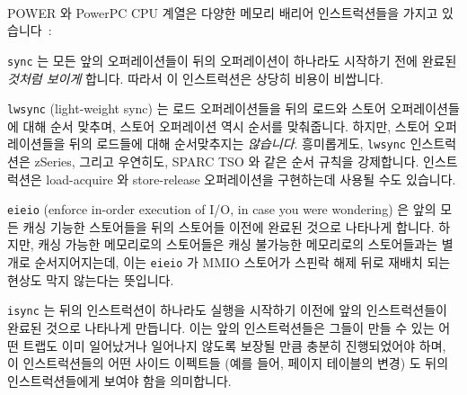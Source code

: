 POWER 와 PowerPC\textsuperscript{\textregistered} CPU 계열은 다양한 메모리
배리어 인스트럭션들을 가지고 있습니다~\cite{PowerPC94,MichaelLyons05a}:
\begin{description}
\item	{\tt sync} 는 모든 앞의 오퍼레이션들이 뒤의 오퍼레이션이 하나라도
	시작하기 전에 완료된 {\em 것처럼 보이게} 합니다.
	따라서 이 인스트럭션은 상당히 비용이 비쌉니다.
\item	{\tt lwsync} (light-weight sync) 는 로드 오퍼레이션들을 뒤의 로드와
	스토어 오퍼레이션들에 대해 순서 맞추며, 스토어 오퍼레이션 역시 순서를
	맞춰줍니다.
	하지만, 스토어 오퍼레이션들을 뒤의 로드들에 대해 순서맞추지는 {\em
	않습니다}.
	흥미롭게도, {\tt lwsync} 인스트럭션은 zSeries, 그리고 우연히도, SPARC
	TSO 와 같은 순서 규칙을 강제합니다.
	 인스트럭션은 load-acquire 와 store-release 오퍼레이션을
	구현하는데 사용될 수도 있습니다.
\item	{\tt eieio} (enforce in-order execution of I/O, in case you were
	wondering) 은 앞의 모든 캐싱 기능한 스토어들을 뒤의 스토어들 이전에
	완료된 것으로 나타나게 합니다.
	하지만, 캐싱 가능한 메모리로의 스토어들은 캐싱 불가능한 메모리로의
	스토어들과는 별개로 순서지어지는데, 이는 {\tt eieio} 가 MMIO 스토어가
	스핀락 해제 뒤로 재배치 되는 현상도 막지 않는다는 뜻입니다.
\item	{\tt isync} 는 뒤의 인스트럭션이 하나라도 실행을 시작하기 이전에 앞의
	인스트럭션들이 완료된 것으로 나타나게 만듭니다.
	이는 앞의 인스트럭션들은 그들이 만들 수 있는 어떤 트랩도 이미
	일어났거나 일어나지 않도록 보장될 만큼 충분히 진행되었어야 하며, 이
	인스트럭션들의 어떤 사이드 이펙트들 (예를 들어, 페이지 테이블의 변경)
	도 뒤의 인스트럭션들에게 보여야 함을 의미합니다.
\end{description}
\iffalse

